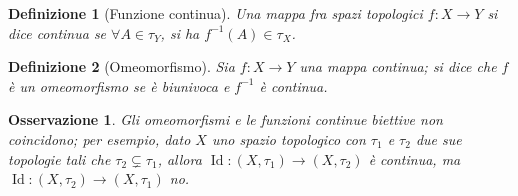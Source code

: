 \documentclass[12pt]{scrartcl}
\theoremstyle{style}
\newtheorem{definizione}{Definizione}[section]
\newtheorem{osservazione}{Osservazione}[section]
\numberwithin{equation}{subsection}
\begin{document}
\begin{definizione}
	[Funzione continua]
	Una mappa fra spazi topologici $f : X \to Y$ si dice \textit{continua} se $\forall A \in \tau _Y$, si ha $f^{-1}(A) \in \tau _X$.
\end{definizione}
\begin{definizione}
	[Omeomorfismo]
	Sia $f:X\to Y$ una mappa continua; si dice che $f$ \`e un \textit{omeomorfismo} se \`e biunivoca e $f^{-1}$ \`e continua.
\end{definizione}
\begin{osservazione}
Gli omeomorfismi e le funzioni continue biettive non coincidono; per esempio, dato $X$ uno spazio topologico con $\tau _1$ e $\tau _2$ due sue topologie tali che $\tau _2 \subsetneq \tau _1$, allora $\operatorname{Id} :(X,\tau _1)\to (X,\tau _2)$ \`e continua, ma $\operatorname{Id} : (X,\tau _2) \to (X,\tau _1)$ no.
\end{osservazione}
\end{document}
